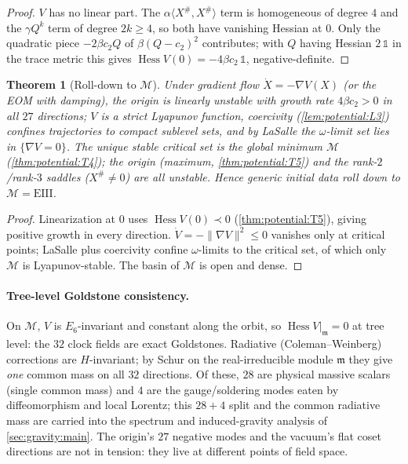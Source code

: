 \documentclass[11pt]{article}
\theoremstyle{plain}
\newtheorem{theorem}{Theorem}[section]
\theoremstyle{definition}
\theoremstyle{remark}
\begin{document}
\begin{proof}
$V$ has no linear part. The $\alpha\langle X^\#,X^\#\rangle$ term is homogeneous of degree $4$
and the $\gamma Q^k$ term of degree $2k\ge4$, so both have vanishing Hessian at $0$. Only the
quadratic piece $-2\beta c_2 Q$ of $\beta(Q-c_2)^2$ contributes; with $Q$ having Hessian
$2\,\mathbb 1$ in the trace metric this gives $\operatorname{Hess}V(0)=-4\beta c_2\,\mathbb 1$,
negative-definite.
\end{proof}

\begin{theorem}[Roll-down to $\mathcal M$]
\label{thm:potential:T6}
Under gradient flow $\dot X=-\nabla V(X)$ (or the EOM with damping), the origin is linearly
unstable with growth rate $4\beta c_2>0$ in all $27$ directions; $V$ is a strict Lyapunov
function, coercivity (\autoref{lem:potential:L3}) confines trajectories to compact sublevel
sets, and by LaSalle the $\omega$-limit set lies in $\{\nabla V=0\}$. The unique stable
critical set is the global minimum $\mathcal M$ (\autoref{thm:potential:T4}); the origin
(maximum, \autoref{thm:potential:T5}) and the rank-$2$/rank-$3$ saddles ($X^\#\neq0$) are all
unstable. Hence generic initial data roll down to $\mathcal M=\mathrm{EIII}$.
\end{theorem}

\begin{proof}
Linearization at $0$ uses $\operatorname{Hess}V(0)\prec0$ (\autoref{thm:potential:T5}), giving
positive growth in every direction. $\dot V=-\|\nabla V\|^2\le0$ vanishes only at critical
points; LaSalle plus coercivity confine $\omega$-limits to the critical set, of which only
$\mathcal M$ is Lyapunov-stable. The basin of $\mathcal M$ is open and dense.
\end{proof}

\paragraph{Tree-level Goldstone consistency.}
On $\mathcal M$, $V$ is $E_6$-invariant and constant along the orbit, so
$\operatorname{Hess}V|_{\mathfrak m}=0$ at tree level: the $32$ clock fields are exact
Goldstones. Radiative (Coleman--Weinberg) corrections are $H$-invariant; by Schur on the
real-irreducible module $\mathfrak m$ they give \emph{one} common mass on all $32$ directions.
Of these, $28$ are physical massive scalars (single common mass) and $4$ are the
gauge/soldering modes eaten by diffeomorphism and local Lorentz; this $28+4$ split and the
common radiative mass are carried into the spectrum and induced-gravity analysis of
\autoref{sec:gravity:main}. The origin's $27$ negative modes and the vacuum's flat coset
directions are not in tension: they live at different points of field space.
\end{document}
